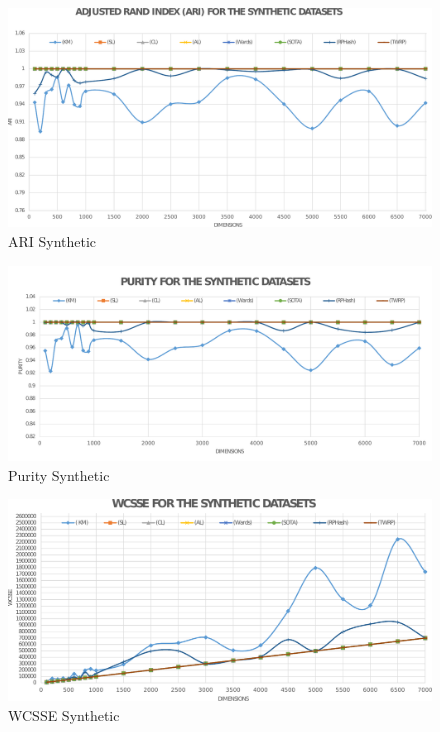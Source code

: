 \begin{figure}
    \centering
    \includegraphics[width=1\linewidth]{figs/ari_synthetic_2} 
    \caption{ARI Synthetic} \label{perfdim1}
\end{figure}
\begin{figure}
    \centering
    \includegraphics[width=1\linewidth]{figs/purity_synthetic_2} 
    \caption{Purity Synthetic} \label{perfdim2}
\end{figure}
\begin{figure}
    \centering
    \includegraphics[width=1\linewidth]{figs/wcsse_synthetic_2} 
    \caption{WCSSE Synthetic}\label{perfdim3} 
\end{figure}

